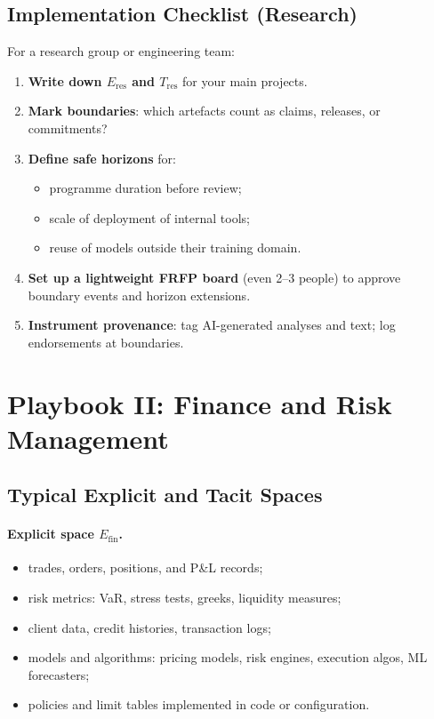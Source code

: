 \subsection{Implementation Checklist (Research)}

For a research group or engineering team:

\begin{enumerate}
  \item \textbf{Write down \(E_{\mathrm{res}}\) and \(T_{\mathrm{res}}\)} for your
        main projects.
  \item \textbf{Mark boundaries}:
        which artefacts count as claims, releases, or commitments?
  \item \textbf{Define safe horizons} for:
        \begin{itemize}
          \item programme duration before review;
          \item scale of deployment of internal tools;
          \item reuse of models outside their training domain.
        \end{itemize}
  \item \textbf{Set up a lightweight FRFP board} (even 2--3 people) to
        approve boundary events and horizon extensions.
  \item \textbf{Instrument provenance}:
        tag AI-generated analyses and text; log endorsements at
        boundaries.
\end{enumerate}

\section{Playbook II: Finance and Risk Management}
\label{sec:playbook-finance}

\subsection{Typical Explicit and Tacit Spaces}

\paragraph{Explicit space \(E_{\mathrm{fin}}\).}

\begin{itemize}
  \item trades, orders, positions, and P\&L records;
  \item risk metrics:
        VaR, stress tests, greeks, liquidity measures;
  \item client data, credit histories, transaction logs;
  \item models and algorithms:
        pricing models, risk engines, execution algos, ML forecasters;
  \item policies and limit tables implemented in code or configuration.
\end{itemize}

